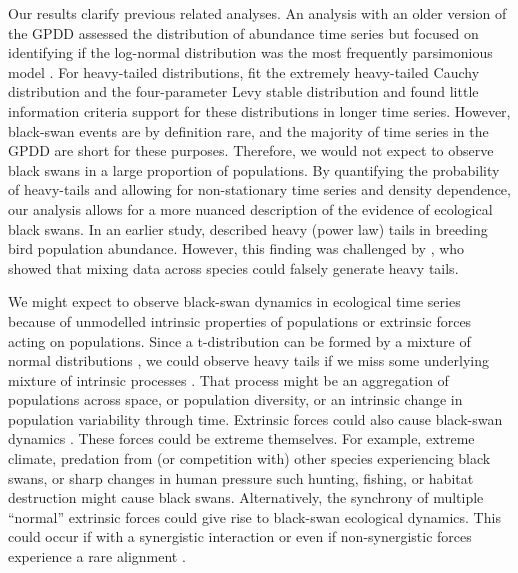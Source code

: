 Our results clarify previous related analyses. An analysis with an older
version of the GPDD assessed the distribution of abundance time series but
focused on identifying if the log-normal distribution was the most frequently
parsimonious model \citep{halley2002}. For heavy-tailed distributions,
\citet{halley2002} fit the extremely heavy-tailed Cauchy distribution and the
four-parameter Levy stable distribution and found little information criteria
support for these distributions in longer time series. However, black-swan
events are by definition rare, and the majority of time series in the GPDD are
short for these purposes. Therefore, we would not expect to observe black
swans in a large proportion of populations. By quantifying the probability of
heavy-tails and allowing for non-stationary time series and density
dependence, our analysis allows for a more nuanced description of the evidence
of ecological black swans. In an earlier study, \citet{keitt1998} described
heavy (power law) tails in breeding bird population abundance. However, this
finding was challenged by \citet{allen2001}, who showed that mixing data
across species could falsely generate heavy tails.

We might expect to observe black-swan dynamics in ecological time series
because of unmodelled intrinsic properties of populations or extrinsic forces
acting on populations. Since a t-distribution can be formed by a mixture of
normal distributions \citep[with the same mean and inverse-gamma-distributed
variances,][]{gelman2014}, we could observe heavy tails if we miss some
underlying mixture of intrinsic processes \citep{allen2001}. That process
might be an aggregation of populations across space, or population diversity,
or an intrinsic change in population variability through time. Extrinsic
forces could also cause black-swan dynamics \citep[e.g.][]{nunez2012}. These
forces could be extreme themselves. For example, extreme climate, predation
from (or competition with) other species experiencing black swans, or sharp
changes in human pressure such hunting, fishing, or habitat destruction might
cause black swans. Alternatively, the synchrony of multiple ``normal''
extrinsic forces could give rise to black-swan ecological dynamics. This could
occur if with a synergistic interaction \citep[e.g.][]{kirby2009} or even if
non-synergistic forces experience a rare alignment \citep{denny2009}.

